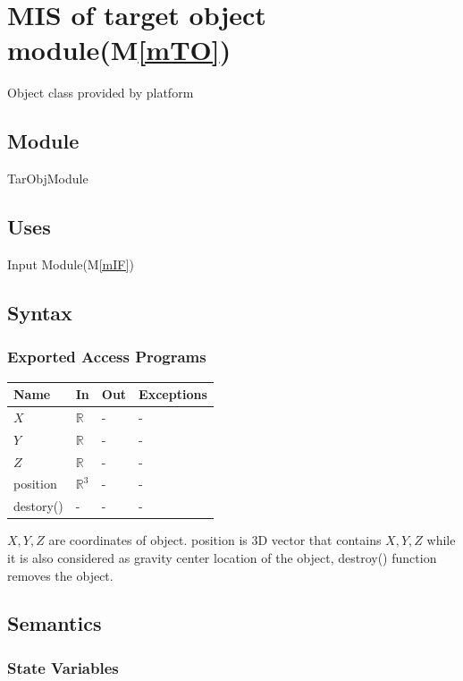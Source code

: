 \documentclass[12pt, titlepage]{article}
\newcommand{\mref}[1]{M\ref{#1}}
\begin{document}
\section{MIS of target object module(\mref{mTO})}

Object class provided by platform

\subsection{Module}

TarObjModule

\subsection{Uses}

Input Module(\mref{mIF})

\subsection{Syntax}

\subsubsection{Exported Access Programs}

\begin{center}
	\begin{tabular}{p{2cm} p{4cm} p{4cm} p{2cm}}
		\hline
		\textbf{Name} & \textbf{In} & \textbf{Out} & \textbf{Exceptions} \\
		\hline
		$X$ & $\mathbb{R}$ & - & - \\
		$Y$ & $\mathbb{R}$ & - & - \\
		$Z$ & $\mathbb{R}$ & - & - \\
		position & $\mathbb{R}^{3}$ & - & - \\
		destory() & - & - & - \\
		\hline		
	\end{tabular}
\end{center}
$X,Y,Z$ are coordinates of object. position is 3D vector that contains $X,Y,Z$ while it is also considered as gravity center location of the object, destroy() function removes the object.
\subsection{Semantics}

\subsubsection{State Variables}
\end{document}
